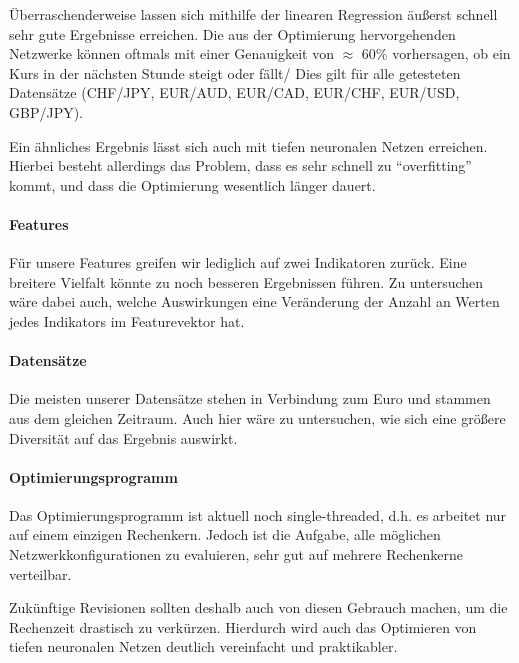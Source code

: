 Überraschenderweise lassen sich mithilfe der linearen Regression äußerst schnell sehr gute Ergebnisse erreichen. Die aus der Optimierung hervorgehenden Netzwerke k\"onnen oftmals mit einer Genauigkeit von $\approx$ 60\% vorhersagen, ob ein Kurs in der nächsten Stunde steigt oder fällt/ Dies gilt f\"ur alle getesteten Datensätze (CHF/JPY, EUR/AUD, EUR/CAD, EUR/CHF, EUR/USD, GBP/JPY).

Ein ähnliches Ergebnis lässt sich auch mit tiefen neuronalen Netzen erreichen. Hierbei besteht allerdings das Problem, dass es sehr schnell zu \enquote{overfitting} kommt, und dass die Optimierung wesentlich länger dauert.

\paragraph{Features}
Für unsere Features greifen wir lediglich auf zwei Indikatoren zurück. Eine breitere Vielfalt könnte zu noch besseren Ergebnissen führen. Zu untersuchen wäre dabei auch, welche Auswirkungen eine Veränderung der Anzahl an Werten jedes Indikators im Featurevektor hat.

\paragraph{Datensätze}
Die meisten unserer Datensätze stehen in Verbindung zum Euro und stammen aus dem gleichen Zeitraum. Auch hier wäre zu untersuchen, wie sich eine größere Diversität auf das Ergebnis auswirkt.

\paragraph{Optimierungsprogramm}
Das Optimierungsprogramm ist aktuell noch single-threaded, d.h. es arbeitet nur auf einem einzigen Rechenkern. Jedoch ist die Aufgabe, alle möglichen Netzwerkkonfigurationen zu evaluieren, sehr gut auf mehrere Rechenkerne verteilbar. 

Zukünftige Revisionen sollten deshalb auch von diesen Gebrauch machen, um die Rechenzeit drastisch zu verkürzen. Hierdurch wird auch das Optimieren von tiefen neuronalen Netzen deutlich vereinfacht und praktikabler.

